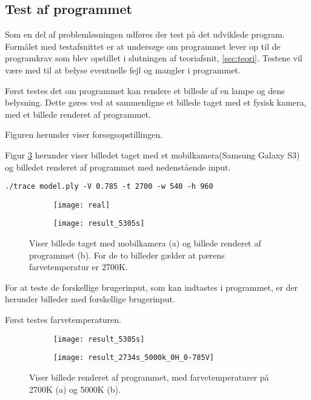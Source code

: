 \subsection{Test af programmet}
\label{sec:test}

Som en del af problemløsningen udføres der test på det udviklede program. Formålet med testafsnittet er at undersøge om programmet lever op til de programkrav som blev opstillet i slutningen af teoriafsnit, \ref{sec:teori}. Testene vil være med til at belyse eventuelle fejl og mangler i programmet.

Først testes det om programmet kan rendere et billede af en lampe og dens belysning. Dette gøres ved at sammenligne et billede taget med et fysisk kamera, med et billede renderet af programmet.

Figuren herunder viser forsøgsopstillingen.


Figur \ref{fig:test_real_fake} herunder viser billedet taget med et mobilkamera(Samsung Galaxy S3) og billedet renderet af programmet med nedenstående input.
\begin{lstlisting}
./trace model.ply -V 0.785 -t 2700 -w 540 -h 960
\end{lstlisting}

\begin{figure}[H]
\centering
\begin{subfigure}{.5\textwidth}
  \centering
  \texttt{[image: real]}
  \caption{}
  \label{fig:real}
\end{subfigure}%
\begin{subfigure}{.5\textwidth}
  \centering
  \texttt{[image: result\_5305s]}
  \caption{}
  \label{fig:fake}
\end{subfigure}
\caption{Viser billede taget med mobilkamera (a) og billede renderet af programmet (b). For de to billeder gælder at pærens farvetemperatur er 2700K.}
\label{fig:test_real_fake}
\end{figure}

For at teste de forskellige brugerinput, som kan indtastes i programmet, er der herunder billeder med forskellige brugerinput.

Først testes farvetemperaturen.
\begin{figure}[H]
\centering
\begin{subfigure}{.5\textwidth}
  \centering
  \texttt{[image: result\_5305s]}
  \caption{}
  \label{fig:real}
\end{subfigure}%
\begin{subfigure}{.5\textwidth}
  \centering
  \texttt{[image: result\_2734s\_5000k\_0H\_0-785V]}
  \caption{}
  \label{fig:fake}
\end{subfigure}
\caption{Viser billede renderet af programmet, med farvetemperaturer på 2700K (a) og 5000K (b).}
\label{fig:farvetemp}
\end{figure}

